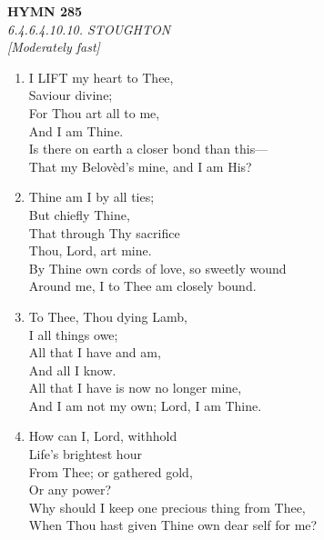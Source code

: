 \documentclass[11pt,a4paper]{article}
\begin{document}
\newpage
\begin{center}
    {\Large \textbf{HYMN 285}}
    \\
    \textit{6.4.6.4.10.10. STOUGHTON}
    \\
    \textit{\small [Moderately fast]}
\end{center}
\vspace{1em}

\begin{enumerate}
    \item I LIFT my heart to Thee, \\
        Saviour divine; \\
        For Thou art all to me, \\
        And I am Thine. \\
        Is there on earth a closer bond than this--- \\
        That my Belov\`ed's mine, and I am His?

    \item Thine am I by all ties; \\
        But chiefly Thine, \\
        That through Thy sacrifice \\
        Thou, Lord, art mine. \\
        By Thine own cords of love, so sweetly wound \\
        Around me, I to Thee am closely bound.

    \item To Thee, Thou dying Lamb, \\
        I all things owe; \\
        All that I have and am, \\
        And all I know. \\
        All that I have is now no longer mine, \\
        And I am not my own; Lord, I am Thine.

    \item How can I, Lord, withhold \\
        Life's brightest hour \\
        From Thee; or gathered gold, \\
        Or any power? \\
        Why should I keep one precious thing from Thee, \\
        When Thou hast given Thine own dear self for me?

\end{enumerate}
\end{document}
